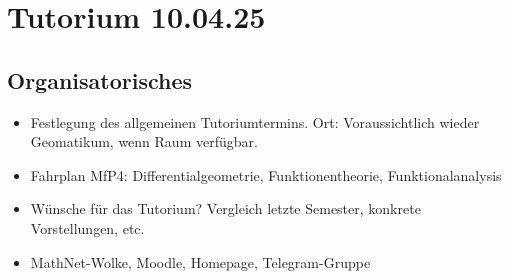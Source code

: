 \section{Tutorium 10.04.25}
\label{sec:10_04_25}

\subsection{Organisatorisches}
\begin{itemize}
\item Festlegung des allgemeinen Tutoriumtermins. Ort: Voraussichtlich wieder Geomatikum, wenn Raum verfügbar.
\item Fahrplan MfP4: Differentialgeometrie, Funktionentheorie, Funktionalanalysis
\item Wünsche für das Tutorium? Vergleich letzte Semester, konkrete Vorstellungen, etc.
\item MathNet-Wolke, Moodle, Homepage, Telegram-Gruppe
\end{itemize}

